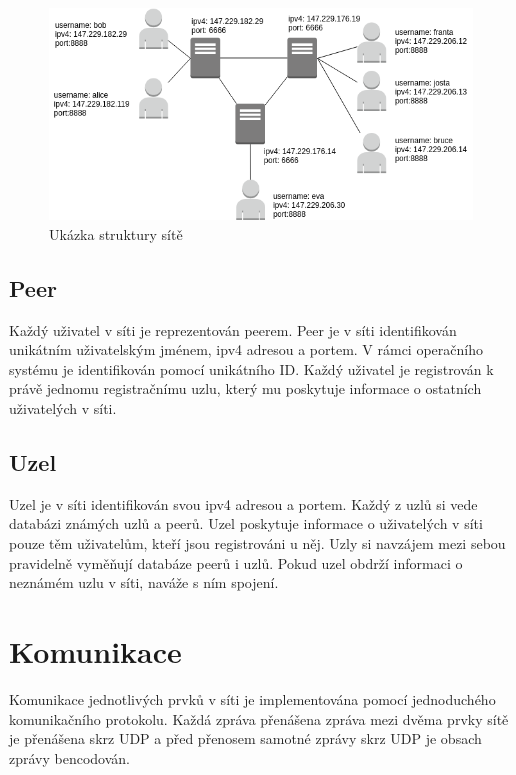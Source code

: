 \documentclass[11pt,a4paper,titlepage]{article}
\begin{document}
        \begin{figure}[htbp]
            \begin{center}
                \includegraphics[scale=0.5]{base.png}
                \caption{Ukázka struktury sítě}
                \label{base}
            \end{center}
        \end{figure}

		\subsection{Peer}
            Každý uživatel v síti je reprezentován peerem. Peer je v síti identifikován unikátním uživatelským
            jménem, ipv4 adresou a portem. V rámci operačního systému je identifikován pomocí unikátního ID.
            Každý uživatel je registrován k právě jednomu registračnímu uzlu, který
            mu poskytuje informace o ostatních uživatelých v síti.

        \subsection{Uzel}
            Uzel je v síti identifikován svou ipv4 adresou a portem. Každý z uzlů si vede databázi známých uzlů a peerů. Uzel poskytuje informace o
            uživatelých v síti pouze těm uživatelům, kteří jsou registrováni u něj. Uzly si
            navzájem mezi sebou pravidelně vyměňují databáze peerů i uzlů. Pokud uzel obdrží informaci
            o neznámém uzlu v síti, naváže s ním spojení.

    \section{Komunikace}
        Komunikace jednotlivých prvků v síti je implementována pomocí jednoduchého komunikačního protokolu. Každá zpráva přenášena
        zpráva mezi dvěma prvky sítě je přenášena skrz UDP a před přenosem samotné zprávy skrz UDP je obsach zprávy
        bencodován.
\end{document}
